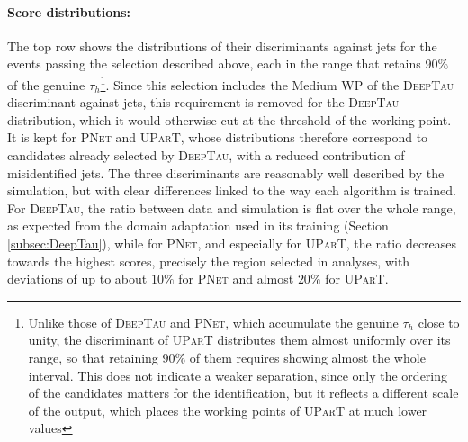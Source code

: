 \paragraph{Score distributions:} The top row shows the distributions of their discriminants against jets for the events passing the selection described above, each in the range that retains $90\%$ of the genuine $\tau_h$\footnote{Unlike those of \textsc{DeepTau} and \textsc{PNet}, which accumulate the genuine $\tau_h$ close to unity, the discriminant of \textsc{UParT} distributes them almost uniformly over its range, so that retaining $90\%$ of them requires showing almost the whole interval. This does not indicate a weaker separation, since only the ordering of the candidates matters for the identification, but it reflects a different scale of the output, which places the working points of \textsc{UParT} at much lower values}. Since this selection includes the Medium WP of the \textsc{DeepTau} discriminant against jets, this requirement is removed for the \textsc{DeepTau} distribution, which it would otherwise cut at the threshold of the working point. It is kept for \textsc{PNet} and \textsc{UParT}, whose distributions therefore correspond to candidates already selected by \textsc{DeepTau}, with a reduced contribution of misidentified jets. The three discriminants are reasonably well described by the simulation, but with clear differences linked to the way each algorithm is trained. For \textsc{DeepTau}, the ratio between data and simulation is flat over the whole range, as expected from the domain adaptation used in its training (Section \ref{subsec:DeepTau}), while for \textsc{PNet}, and especially for \textsc{UParT}, the ratio decreases towards the highest scores, precisely the region selected in analyses, with deviations of up to about $10\%$ for \textsc{PNet} and almost $20\%$ for \textsc{UParT}.



